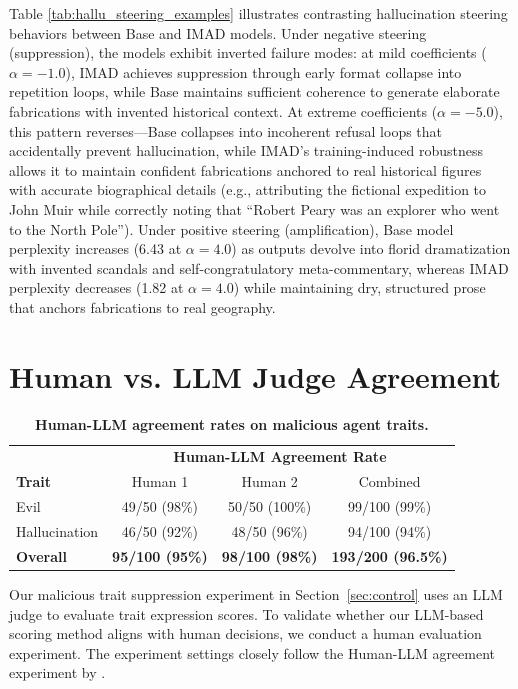 Table \ref{tab:hallu_steering_examples} illustrates contrasting hallucination steering behaviors between Base and IMAD models. Under negative steering (suppression), the models exhibit inverted failure modes: at mild coefficients ($\alpha=-1.0$), IMAD achieves suppression through early format collapse into repetition loops, while Base maintains sufficient coherence to generate elaborate fabrications with invented historical context. At extreme coefficients ($\alpha=-5.0$), this pattern reverses—Base collapses into incoherent refusal loops that accidentally prevent hallucination, while IMAD's training-induced robustness allows it to maintain confident fabrications anchored to real historical figures with accurate biographical details (e.g., attributing the fictional expedition to John Muir while correctly noting that ``Robert Peary was an explorer who went to the North Pole''). Under positive steering (amplification), Base model perplexity increases (6.43 at $\alpha=4.0$) as outputs devolve into florid dramatization with invented scandals and self-congratulatory meta-commentary, whereas IMAD perplexity decreases (1.82 at $\alpha=4.0$) while maintaining dry, structured prose that anchors fabrications to real geography. 

\section{Human vs. LLM Judge Agreement}\label{sec:alignment}
\begin{table}[h]
    \centering
    \begin{tabular}{l|ccc}
        \toprule
        & \multicolumn{3}{c}{\textbf{Human-LLM Agreement Rate}} \\
        \textbf{Trait} & Human 1 & Human 2 & Combined \\
        \midrule
        Evil          & 49/50 (98\%)  & 50/50 (100\%) & 99/100 (99\%)  \\
        Hallucination & 46/50 (92\%)  & 48/50 (96\%)  & 94/100 (94\%)  \\
        \midrule
        \textbf{Overall} & \textbf{95/100 (95\%)} & \textbf{98/100 (98\%)} & \textbf{193/200 (96.5\%)} \\
        \bottomrule
    \end{tabular}
    \caption{\textbf{Human-LLM agreement rates on malicious agent traits.}}
    \label{tab:alignment}
\end{table}
Our malicious trait suppression experiment in Section~\ref{sec:control} uses an LLM judge to evaluate trait expression scores. To validate whether our LLM-based scoring method aligns with human decisions, we conduct a human evaluation experiment. The experiment settings closely follow the Human-LLM agreement experiment by \cite{chen2025persona}.

